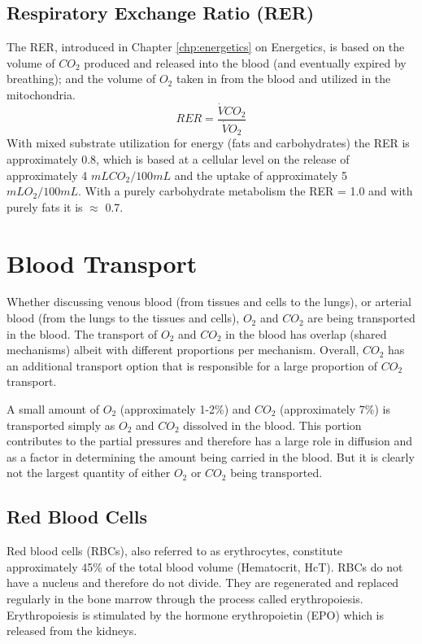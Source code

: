 \subsection{Respiratory Exchange Ratio (RER)}

The RER, introduced in Chapter \ref{chp:energetics} on Energetics, is based on the volume of $CO_2$ produced and released into the blood (and eventually expired by breathing); and the volume of $O_2$ taken in from the blood and utilized in the mitochondria. 
\begin{equation}
    RER = \frac{\dot{V}CO_2}{\dot{V}O_2}
\end{equation}
With mixed substrate utilization for energy (fats and carbohydrates) the RER is approximately 0.8, which is based at a cellular level on the release of approximately 4 $mL CO_2 / 100 mL$ and the uptake of approximately 5 $mL O_2 / 100 mL$. With a purely carbohydrate metabolism the RER = 1.0 and with purely fats it is $\approx$ 0.7. 



\section{Blood Transport}

Whether discussing venous blood (from tissues and cells to the lungs), or arterial blood (from the lungs to the tissues and cells), $O_2$ and $CO_2$ are being transported in the blood. The transport of $O_2$ and $CO_2$ in the blood has overlap (shared mechanisms) albeit with different proportions per mechanism. Overall, $CO_2$ has an additional transport option that is responsible for a large proportion of $CO_2$ transport.

A small amount of $O_2$ (approximately 1-2\%) and $CO_2$ (approximately 7\%) is transported simply as $O_2$ and $CO_2$ dissolved in the blood. This portion contributes to the partial pressures and therefore has a large role in diffusion and as a factor in determining the amount being carried in the blood. But it is clearly not the largest quantity of either $O_2$ or $CO_2$ being transported.

\subsection{Red Blood Cells}

Red blood cells (RBCs), also referred to as erythrocytes, constitute approximately 45\% of the total blood volume (Hematocrit, HcT). RBCs do not have a nucleus and therefore do not divide. They are regenerated and replaced regularly in the bone marrow through the process called erythropoiesis. Erythropoiesis is stimulated by the hormone erythropoietin (EPO) which is released from the kidneys.

